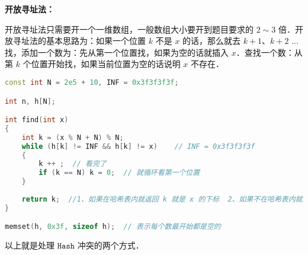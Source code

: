 \textbf{开放寻址法：}

开放寻址法只需要开一个一维数组，一般数组大小要开到题目要求的 $2 \sim 3$ 倍．开放寻址法的基本思路为：如果一个位置 $k$ 不是 $x$ 的话，那么就去 $k + 1$、$k + 2$ ... 找，添加一个数为：先从第一个位置找，如果为空的话就插入 $x$．查找一个数：从第 $k$ 个位置开始找，如果当前位置为空的话说明 $x$ 不存在．

\begin{lstlisting}[language=cpp]
const int N = 2e5 + 10, INF = 0x3f3f3f3f;

int n, h[N];

int find(int x)
{
    int k = (x % N + N) % N;
    while (h[k] != INF && h[k] != x)    // INF = 0x3f3f3f3f
    {
        k ++ ;  // 看完了 
        if (k == N) k = 0;  // 就循环看第一个位置
    }
    
    return k;  //1、如果在哈希表内就返回 k 就是 x 的下标  2、如果不在哈希表内就返回应该存储的位置
}

memset(h, 0x3f, sizeof h);  // 表示每个数最开始都是空的
\end{lstlisting}

以上就是处理 $\mathtt{Hash}$ 冲突的两个方式．